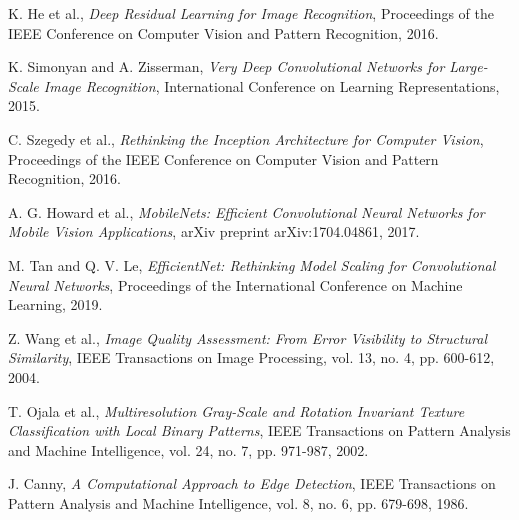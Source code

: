 \documentclass[12pt]{article}
\begin{document}
\begin{thebibliography}{99}
K. He et al.,
\textit{Deep Residual Learning for Image Recognition},
Proceedings of the IEEE Conference on Computer Vision and Pattern Recognition, 2016.

K. Simonyan and A. Zisserman,
\textit{Very Deep Convolutional Networks for Large-Scale Image Recognition},
International Conference on Learning Representations, 2015.

C. Szegedy et al.,
\textit{Rethinking the Inception Architecture for Computer Vision},
Proceedings of the IEEE Conference on Computer Vision and Pattern Recognition, 2016.

A. G. Howard et al.,
\textit{MobileNets: Efficient Convolutional Neural Networks for Mobile Vision Applications},
arXiv preprint arXiv:1704.04861, 2017.

M. Tan and Q. V. Le,
\textit{EfficientNet: Rethinking Model Scaling for Convolutional Neural Networks},
Proceedings of the International Conference on Machine Learning, 2019.

Z. Wang et al.,
\textit{Image Quality Assessment: From Error Visibility to Structural Similarity},
IEEE Transactions on Image Processing, vol. 13, no. 4, pp. 600-612, 2004.

T. Ojala et al.,
\textit{Multiresolution Gray-Scale and Rotation Invariant Texture Classification with Local Binary Patterns},
IEEE Transactions on Pattern Analysis and Machine Intelligence, vol. 24, no. 7, pp. 971-987, 2002.

J. Canny,
\textit{A Computational Approach to Edge Detection},
IEEE Transactions on Pattern Analysis and Machine Intelligence, vol. 8, no. 6, pp. 679-698, 1986.

\end{thebibliography}
\end{document}
